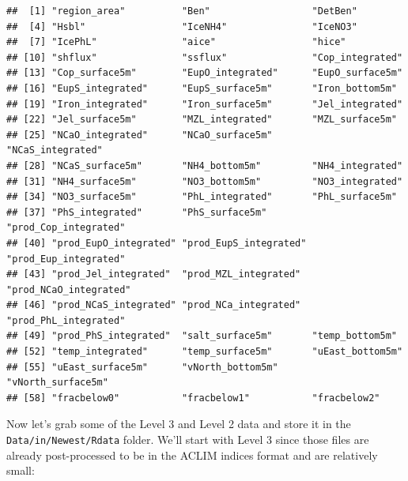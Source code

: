 \documentclass[
]{article}
\begin{document}
\begin{verbatim}
##  [1] "region_area"          "Ben"                  "DetBen"              
##  [4] "Hsbl"                 "IceNH4"               "IceNO3"              
##  [7] "IcePhL"               "aice"                 "hice"                
## [10] "shflux"               "ssflux"               "Cop_integrated"      
## [13] "Cop_surface5m"        "EupO_integrated"      "EupO_surface5m"      
## [16] "EupS_integrated"      "EupS_surface5m"       "Iron_bottom5m"       
## [19] "Iron_integrated"      "Iron_surface5m"       "Jel_integrated"      
## [22] "Jel_surface5m"        "MZL_integrated"       "MZL_surface5m"       
## [25] "NCaO_integrated"      "NCaO_surface5m"       "NCaS_integrated"     
## [28] "NCaS_surface5m"       "NH4_bottom5m"         "NH4_integrated"      
## [31] "NH4_surface5m"        "NO3_bottom5m"         "NO3_integrated"      
## [34] "NO3_surface5m"        "PhL_integrated"       "PhL_surface5m"       
## [37] "PhS_integrated"       "PhS_surface5m"        "prod_Cop_integrated" 
## [40] "prod_EupO_integrated" "prod_EupS_integrated" "prod_Eup_integrated" 
## [43] "prod_Jel_integrated"  "prod_MZL_integrated"  "prod_NCaO_integrated"
## [46] "prod_NCaS_integrated" "prod_NCa_integrated"  "prod_PhL_integrated" 
## [49] "prod_PhS_integrated"  "salt_surface5m"       "temp_bottom5m"       
## [52] "temp_integrated"      "temp_surface5m"       "uEast_bottom5m"      
## [55] "uEast_surface5m"      "vNorth_bottom5m"      "vNorth_surface5m"    
## [58] "fracbelow0"           "fracbelow1"           "fracbelow2"
\end{verbatim}

Now let's grab some of the Level 3 and Level 2 data and store it in the
\texttt{Data/in/Newest/Rdata} folder. We'll start with Level 3 since
those files are already post-processed to be in the ACLIM indices format
and are relatively small:
\end{document}
